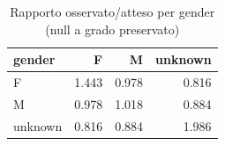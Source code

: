 \begin{table}
\centering
\caption{Rapporto osservato/atteso per gender (null a grado preservato)}
\label{tab:t3_mixing_gender_oss_att}
\begin{tabular}{lrrr}
\toprule
 gender &     F &     M &  unknown \\
\midrule
      F & 1.443 & 0.978 &    0.816 \\
      M & 0.978 & 1.018 &    0.884 \\
unknown & 0.816 & 0.884 &    1.986 \\
\bottomrule
\end{tabular}
\end{table}
